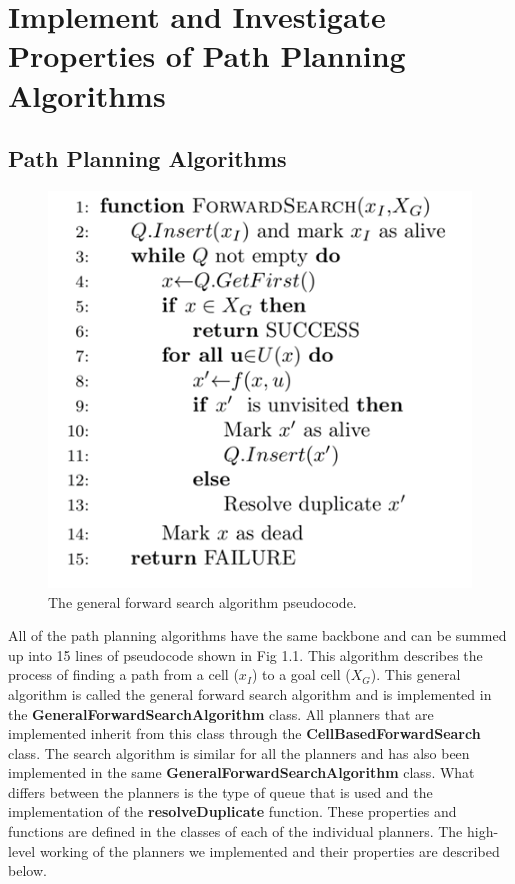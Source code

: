 \documentclass[a4paper,12pt]{article}
\begin{document}
	\pagebreak
	
	\tableofcontents
	
	\pagebreak
	
	\section{Implement and Investigate Properties of Path Planning Algorithms}
		
	\subsection{Path Planning Algorithms}
			
			\begin{figure}[H]
				\renewcommand\thefigure{1.1}
				\centering
				
				\includegraphics[scale=0.6]{images/general_forward_search_pseudocode.png}
				\caption{The general forward search algorithm pseudocode. }
			\end{figure}
			
			All of the path planning algorithms have the same backbone and can be summed up into 15 lines of pseudocode shown in Fig 1.1. This algorithm describes the process of finding a path from a cell ($x_I$) to a goal cell ($X_G$). This general algorithm is called the general forward search algorithm and is implemented in the \textbf{GeneralForwardSearchAlgorithm} class. All planners that are implemented inherit from this class through the \textbf{CellBasedForwardSearch} class. The search algorithm is similar for all the planners and has also been implemented in the same \textbf{GeneralForwardSearchAlgorithm} class. What differs between the planners is the type of queue that is used and the implementation of the \textbf{resolveDuplicate} function. These properties and functions are defined in the classes of each of the individual planners. The high-level working of the planners we implemented and their properties are described below.
			
\end{document}
